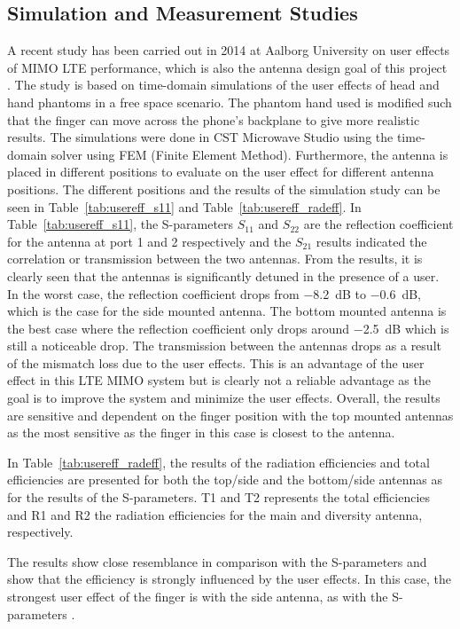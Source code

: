 \subsection{Simulation and Measurement Studies}
A recent study has been carried out in 2014 at Aalborg University on user effects of MIMO LTE performance, which is also the antenna design goal of this project \cite{Samantha2014UserEff}. The study is based on time-domain simulations of the user effects of head and hand phantoms in a free space scenario. The phantom hand used is modified such that the finger can move across the phone's backplane to give more realistic results. The simulations were done in CST Microwave Studio using the time-domain solver using FEM (Finite Element Method). Furthermore, the antenna is placed in different positions to evaluate on the user effect for different antenna positions. The different positions and the results of the simulation study can be seen in Table~\ref{tab:usereff_s11} and Table~\ref{tab:usereff_radeff}. In Table~\ref{tab:usereff_s11}, the S-parameters $S_{11}$ and $S_{22}$ are the reflection coefficient for the antenna at port 1 and 2 respectively and the $S_{21}$ results indicated the correlation or transmission between the two antennas. From the results, it is clearly seen that the antennas is significantly detuned in the presence of a user. In the worst case, the reflection coefficient drops from \SI{-8.2}{dB} to \SI{-0.6}{dB}, which is the case for the side mounted antenna. The bottom mounted antenna is the best case where the reflection coefficient only drops around \SI{-2.5}{dB} which is still a noticeable drop. The transmission between the antennas drops as a result of the mismatch loss due to the user effects. This is an advantage of the user effect in this LTE MIMO system but is clearly not a reliable advantage as the goal is to improve the system and minimize the user effects. Overall, the results are sensitive and dependent on the finger position with the top mounted antennas as the most sensitive as the finger in this case is closest to the antenna.


In Table~\ref{tab:usereff_radeff}, the results of the radiation efficiencies and total efficiencies are presented for both the top/side and the bottom/side antennas as for the results of the S-parameters. T1 and T2 represents the total efficiencies and R1 and R2 the radiation efficiencies for the main and diversity antenna, respectively. 

The results show close resemblance in comparison with the S-parameters and show that the efficiency is strongly influenced by the user effects. In this case, the strongest user effect of the finger is with the side antenna, as with the S-parameters \cite{Samantha2014UserEff}.

